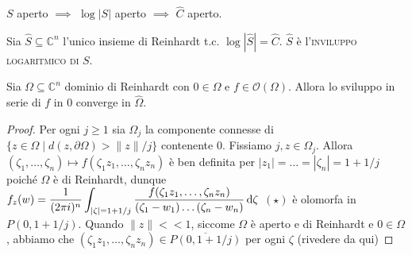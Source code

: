 \begin{oss}
  $S$ aperto $\implies$ $\log{|S|}$ aperto $\implies$ $\hat{C}$ aperto.
\end{oss}

\begin{defn}
  Sia $\hat{S} \subseteq \mathbb{C}^n$ l'unico insieme di Reinhardt t.c. $\log{|\hat{S}|}=\hat{C}$. $\hat{S}$ è l'\textsc{inviluppo logaritmico di $S$}.
\end{defn}

\begin{prop}
  Sia $\Omega \subseteq \mathbb{C}^n$ dominio di Reinhardt con $0 \in \Omega$ e $f \in \mathcal{O}(\Omega)$. Allora lo sviluppo in serie di $f$ in $0$ converge in $\hat{\Omega}$.
\end{prop}

\begin{proof}
  Per ogni $j \ge 1$ sia $\Omega_j$ la componente connesse di $\{z \in \Omega \mid d(z,\partial\Omega)>\|z\|/j\}$ contenente $0$. Fissiamo $j, z \in \Omega_j$.
  Allora $(\zeta_1, \dots, \zeta_n) \longmapsto f(\zeta_1z_1,\dots,\zeta_nz_n)$ è ben definita per $|z_1|=\dots=|\zeta_n|=1+1/j$ poiché $\Omega$ è di Reinhardt, dunque $\displaystyle f_z(w)=\frac{1}{(2\pi i)^n} \int_{|\zeta|=1+1/j} \frac{f(\zeta_1z_1, \dots, \zeta_nz_n)}{(\zeta_1-w_1)\dots(\zeta_n-w_n)}\mathop{}\!\mathrm{d} \zeta$ $(\star)$ è olomorfa in $P(0, 1+1/j)$.
  Quando $\|z\|<<1$, siccome $\Omega$ è aperto e di Reinhardt e $0 \in \Omega$, abbiamo che $(\zeta_1z_1,\dots,\zeta_nz_n) \in \overline{P(0,1+1/j)}$ per ogni $\zeta$ (rivedere da qui)
\end{proof}
